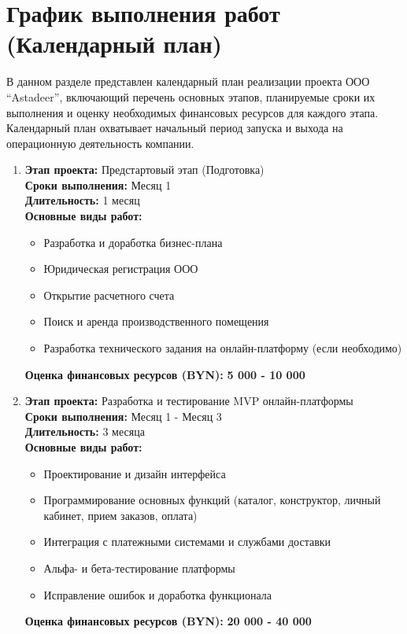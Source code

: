 \section{График выполнения работ (Календарный план)}

В данном разделе представлен календарный план реализации проекта ООО ``Astadeer'', включающий перечень основных этапов, планируемые сроки их выполнения и оценку необходимых финансовых ресурсов для каждого этапа.  Календарный план охватывает начальный период запуска и выхода на операционную деятельность компании.

\vspace{0.3cm}

\begin{enumerate}
    \item \textbf{Этап проекта:} Предстартовый этап (Подготовка) \\
        \textbf{Сроки выполнения:} Месяц 1 \\
        \textbf{Длительность:} 1 месяц \\
        \textbf{Основные виды работ:}
        \begin{itemize}
            \item Разработка и доработка бизнес-плана
            \item Юридическая регистрация ООО
            \item Открытие расчетного счета
            \item Поиск и аренда производственного помещения
            \item Разработка технического задания на онлайн-платформу (если необходимо)
        \end{itemize}
        \textbf{Оценка финансовых ресурсов (BYN):} \textbf{5 000 - 10 000}
        \vspace{0.2cm}

    \item \textbf{Этап проекта:} Разработка и тестирование MVP онлайн-платформы \\
        \textbf{Сроки выполнения:} Месяц 1 - Месяц 3 \\
        \textbf{Длительность:} 3 месяца \\
        \textbf{Основные виды работ:}
        \begin{itemize}
            \item Проектирование и дизайн интерфейса
            \item Программирование основных функций (каталог, конструктор, личный кабинет, прием заказов, оплата)
            \item Интеграция с платежными системами и службами доставки
            \item Альфа- и бета-тестирование платформы
            \item Исправление ошибок и доработка функционала
        \end{itemize}
        \textbf{Оценка финансовых ресурсов (BYN):} \textbf{20 000 - 40 000}
        \vspace{0.2cm}


\end{enumerate}
